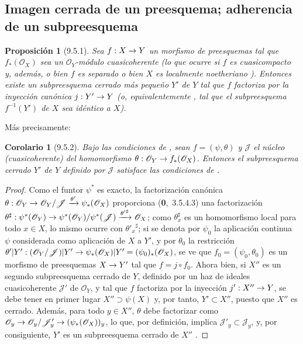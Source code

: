 \documentclass[oneside]{amsart}
\theoremstyle{ega-env-style}
\theoremstyle{ega-thm-env-style}
\newtheorem*{proposition}{Proposición}
\newtheorem*{corollary}{Corolario}
\theoremstyle{ega-defn-env-style}
\renewcommand{\to}{\mathchoice{\longrightarrow}{\rightarrow}{\rightarrow}{\rightarrow}}
\newcommand{\oldpage}[2][]{{\marginnote{\normalfont{\textbf{#1}~|~#2}}}\ignorespaces}
\let\EGAOriginalLabel\label
\renewcommand{\label}[1]{\phantomsection\EGAOriginalLabel{#1}}
\newcommand{\erratum}[2][]{{#2}\marginpar{\footnotesize\textbf{Err}\textsubscript{#1}}}
\begin{document}
\subsection{Imagen cerrada de un preesquema; adherencia de un subpreesquema}
\label{subsection:I.9.5}

\begin{proposition}[9.5.1]
\label{I.9.5.1}
Sea $f:X\to Y$ un morfismo de preesquemas tal que $f_*(\mathscr{O}_X)$ sea un
$\mathscr{O}_Y$-módulo cuasicoherente (lo que ocurre si $f$ es cuasicompacto y, además,
o bien $f$ es separado o bien $X$ es localmente noetheriano ). Entonces
existe un subpreesquema cerrado más pequeño $Y'$ de $Y$ tal que $f$ factoriza por la inyección
canónica $j:Y'\to Y$ \textup{(o, equivalentemente , tal que el
subpreesquema $f^{-1}(Y')$ de $X$ sea \emph{idéntico a} $X$)}.
\end{proposition}

Más precisamente:
\begin{corollary}[9.5.2]
\label{I.9.5.2}
Bajo las condiciones de , sean $f=(\psi,\theta)$ y $\mathscr{J}$ el
núcleo (cuasicoherente) del homomorfismo $\theta:\mathscr{O}_Y\to f_*(\mathscr{O}_X)$. Entonces el
subpreesquema cerrado $Y'$ de $Y$ definido por $\mathscr{J}$ satisface las condiciones de
.
\end{corollary}

\begin{proof}
Como el funtor $\psi^*$ es exacto, la factorización canónica
$\theta:\mathscr{O}_Y\to\mathscr{O}_Y/\mathscr{J}
\xrightarrow{\theta'}\psi_*(\mathscr{O}_X)$ proporciona (\textbf{0},~3.5.4.3)
una factorización
$\theta^\sharp:\psi^*(\mathscr{O}_Y)
\to\psi^*(\mathscr{O}_Y)/\psi^*(\mathscr{J})
\xrightarrow{{\theta'}^\sharp}\mathscr{O}_X$; como $\theta_x^\sharp$ es un homomorfismo local para
todo $x\in X$, lo mismo ocurre con ${\theta'_x}^\sharp$; si se denota por $\psi_0$ la
aplicación continua $\psi$ considerada como aplicación de $X$ a \erratum[II]{$Y'$}, y por $\theta_0$ la restricción
$\theta'|Y':(\mathscr{O}_Y/\mathscr{J})|Y'
\to\psi_*(\mathscr{O}_X)|Y'=(\psi_0)_*(\mathscr{O}_X)$, se ve que
$f_0=(\psi_0,\theta_0)$ es un morfismo de preesquemas $X\to Y'$  tal que
$f=j\circ f_0$. Ahora bien, si $X''$
\oldpage[I]{177}
es un segundo subpreesquema cerrado de $Y$, definido por un haz de ideales cuasicoherente $\mathscr{J}'$ de
$\mathscr{O}_Y$, y tal que $f$ factoriza por la inyección $j':X''\to Y$, se debe tener en primer lugar $X''\supset\psi(X)$ y, por tanto, $Y'\subset X''$, puesto que $X''$ es cerrado.
Además, para todo $y\in X''$, $\theta$ debe factorizar como
$\mathscr{O}_y\to\mathscr{O}_y/\mathscr{J}'_y
\to(\psi_*(\mathscr{O}_X))_y$, lo que, por definición, implica
$\mathscr{J}'_y\subset\mathscr{J}_y$, y, por consiguiente, $Y'$ es un subpreesquema cerrado de $X''$
.
\end{proof}
\end{document}
